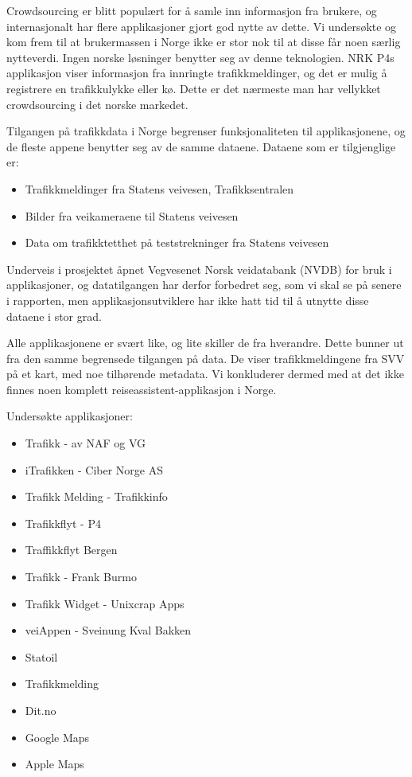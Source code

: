 \documentclass[a4paper,norsk,oneside]{book}
\begin{document}
Crowdsourcing er blitt populært for å samle inn informasjon fra brukere, og internasjonalt har flere applikasjoner gjort god nytte av dette. Vi undersøkte og kom frem til at brukermassen i Norge ikke er stor nok til at disse får noen særlig nytteverdi. Ingen norske løsninger benytter seg av denne teknologien. NRK P4s applikasjon viser informasjon fra innringte trafikkmeldinger, og det er mulig å registrere en trafikkulykke eller kø. Dette er det nærmeste man har vellykket crowdsourcing i det norske markedet.

Tilgangen på trafikkdata i Norge begrenser funksjonaliteten til applikasjonene, og de fleste appene benytter seg av de samme dataene. Dataene som er tilgjenglige er:

\begin{itemize}
\item Trafikkmeldinger fra Statens veivesen, Trafikksentralen
\item Bilder fra veikameraene til Statens veivesen
\item Data om trafikktetthet på teststrekninger fra Statens veivesen
\end{itemize}
Underveis i prosjektet åpnet Vegvesenet Norsk veidatabank (NVDB) for bruk i applikasjoner, og datatilgangen har derfor forbedret seg, som vi skal se på senere i rapporten, men applikasjonsutviklere har ikke hatt tid til å utnytte disse dataene i stor grad.

Alle applikasjonene er svært like, og lite skiller de fra hverandre. Dette bunner ut fra den samme begrensede tilgangen på data. De viser trafikkmeldingene fra SVV på et kart, med noe tilhørende metadata. Vi konkluderer dermed med at det ikke finnes noen komplett reiseassistent-applikasjon i Norge.

Undersøkte applikasjoner:

\begin{itemize}
\item Trafikk - av NAF og VG
\item iTrafikken - Ciber Norge AS
\item Trafikk Melding - Trafikkinfo
\item Trafikkflyt - P4
\item Traffikkflyt Bergen
\item Trafikk - Frank Burmo
\item Trafikk Widget - Unixcrap Apps
\item veiAppen - Sveinung Kval Bakken
\item Statoil
\item Trafikkmelding
\item Dit.no
\item Google Maps
\item Apple Maps
\end{itemize}
\end{document}
